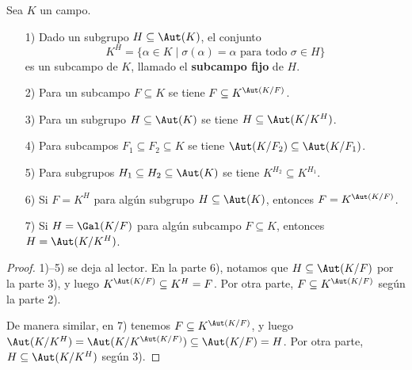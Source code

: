 \begin{proposicion}
  Sea $K$ un campo.

  \begin{enumerate}
  \item[1)] Dado un subgrupo $H \subseteq \Aut (K)$, el conjunto
    $$K^H = \{ \alpha \in K \mid \sigma (\alpha) = \alpha\text{ para todo }\sigma\in H \}$$
    es un subcampo de $K$, llamado el \textbf{subcampo fijo} de $H$.

  \item[2)] Para un subcampo $F\subseteq K$ se tiene
    $F \subseteq K^{\Aut (K/F)}$.

  \item[3)] Para un subgrupo $H \subseteq \Aut (K)$ se tiene
    $H \subseteq \Aut (K/K^H)$.

  \item[4)] Para subcampos $F_1 \subseteq F_2 \subseteq K$ se tiene
    $\Aut (K/F_2) \subseteq \Aut (K/F_1)$.

  \item[5)] Para subgrupos $H_1 \subseteq H_2 \subseteq \Aut (K)$ se tiene
    $K^{H_2} \subseteq K^{H_1}$.

  \item[6)] Si $F = K^H$ para algún subgrupo $H \subseteq \Aut (K)$, entonces
    $F = K^{\Aut (K/F)}$.
    
  \item[7)] Si $H = \Gal (K/F)$ para algún subcampo $F \subseteq K$, entonces
    $H = \Aut (K/K^H)$.
  \end{enumerate}

  \begin{proof}
    1)--5) se deja al lector. En la parte 6), notamos que
    $H \subseteq \Aut (K/F)$ por la parte 3), y luego
    $K^{\Aut (K/F)} \subseteq K^H = F$. Por otra parte,
    $F \subseteq K^{\Aut (K/F)}$ según la parte 2).

    De manera similar, en 7) tenemos $F \subseteq K^{\Aut (K/F)}$, y luego
    $\Aut (K/K^H) = \Aut (K/K^{\Aut (K/F)}) \subseteq \Aut (K/F) = H$.
    Por otra parte, $H \subseteq \Aut (K/K^H)$ según 3).
  \end{proof}
\end{proposicion}

